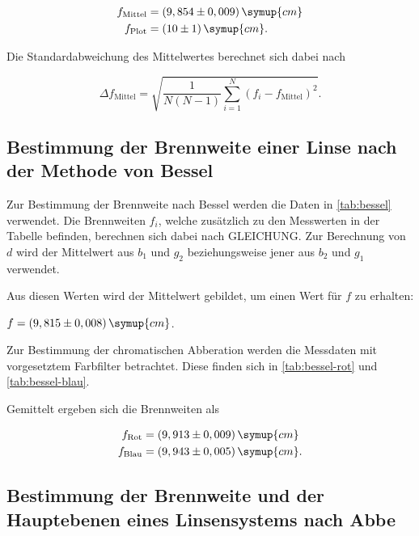 \begin{align*}
    f_\text{Mittel} &= (9,854 \pm 0,009) \, \symup{cm}\\
    f_\text{Plot} &= (10 \pm 1) \, \symup{cm}.
\end{align*}

Die Standardabweichung des Mittelwertes berechnet sich dabei nach

\begin{equation}
  \Delta f_\text{Mittel} = \sqrt{ \frac{1}{N(N-1)} \sum^N_{i=1} (f_i - f_\text{Mittel})^2 }.
\end{equation}

\subsection{Bestimmung der Brennweite einer Linse nach der Methode von Bessel}

Zur Bestimmung der Brennweite nach Bessel werden die Daten in \autoref{tab:bessel} verwendet.
Die Brennweiten $f_i$, welche zusätzlich zu den Messwerten in der Tabelle befinden, berechnen sich dabei nach GLEICHUNG.
Zur Berechnung von $d$ wird der Mittelwert aus $b_1$ und $g_2$ beziehungsweise jener aus $b_2$ und $g_1$ verwendet.



Aus diesen Werten wird der Mittelwert gebildet, um einen Wert für $f$ zu erhalten:

\begin{center}
  $f = (9,815 \pm 0,008) \, \symup{cm}$.
\end{center}

Zur Bestimmung der chromatischen Abberation werden die Messdaten mit vorgesetztem Farbfilter betrachtet.
Diese finden sich in \autoref{tab:bessel-rot} und \autoref{tab:bessel-blau}.





Gemittelt ergeben sich die Brennweiten als

\begin{align*}
  f_\text{Rot} &=  (9,913 \pm 0,009) \, \symup{cm}\\
  f_\text{Blau} &= (9,943 \pm 0,005) \, \symup{cm}.
\end{align*}



\subsection{Bestimmung der Brennweite und der Hauptebenen eines Linsensystems nach Abbe}

